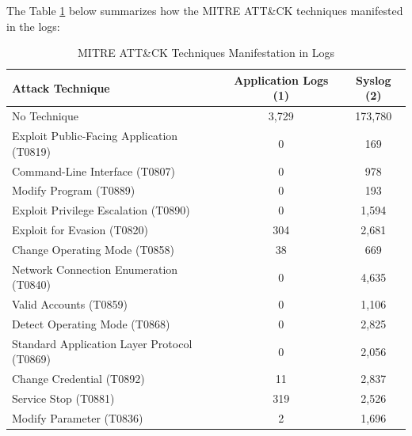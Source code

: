 \documentclass[Master,BMR,english]{twbook}
\begin{document}
The Table \ref{tab:mitre_manifestation} below summarizes how the MITRE ATT\&CK techniques manifested in the logs:

\begin{table}[!htbp]
    \centering
    \begin{tabular}{|l|c|c|}
        \hline
        \textbf{Attack Technique} & \textbf{Application Logs (1)} & \textbf{Syslog (2)} \\
        \hline
        No Technique & 3,729 & 173,780 \\
        Exploit Public-Facing Application (T0819) & 0 & 169 \\
        Command-Line Interface (T0807) & 0 & 978 \\
        Modify Program (T0889) & 0 & 193 \\
        Exploit Privilege Escalation (T0890) & 0 & 1,594 \\
        Exploit for Evasion (T0820) & 304 & 2,681 \\
        Change Operating Mode (T0858) & 38 & 669 \\
        Network Connection Enumeration (T0840) & 0 & 4,635 \\
        Valid Accounts (T0859) & 0 & 1,106 \\
        Detect Operating Mode (T0868) & 0 & 2,825 \\
        Standard Application Layer Protocol (T0869) & 0 & 2,056 \\
        Change Credential (T0892) & 11 & 2,837 \\
        Service Stop (T0881) & 319 & 2,526 \\
        Modify Parameter (T0836) & 2 & 1,696 \\
        \hline
    \end{tabular}
    \caption{MITRE ATT\&CK Techniques Manifestation in Logs}
    \label{tab:mitre_manifestation}
\end{table}
\end{document}
